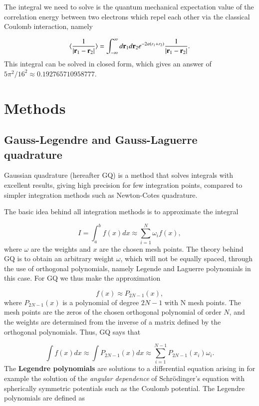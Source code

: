 \documentclass{article}
\begin{document}
\begin{multicols}{2}
The integral we need to solve is the quantum mechanical expectation value of the correlation energy between two electrons which repel each other via the classical Coulomb interaction, namely

\begin{equation}\label{eq:correlationenergy}
	\langle \frac{1}{|{\bf r}_1-{\bf r}_2|} \rangle = \int_{-\infty}^{\infty} d{\bf r}_1d{\bf r}_2  e^{-2\alpha (r_1+r_2)}\frac{1}{|{\bf r}_1-{\bf r}_2|}.
\end{equation}
This integral can be solved in closed form, which gives an answer of $5\pi^2/16^2 \approx 0.192765710958777$.



\section{Methods}

\subsection{Gauss-Legendre and Gauss-Laguerre quadrature}
Gaussian quadrature (hereafter GQ) is a method that solves integrals with excellent results, giving high precision for few integration points, compared to simpler integration methods such as Newton-Cotes quadrature. 

The basic idea behind all integration methods is to approximate the integral

\begin{equation}
	I = \int_a^b f(x) dx \approx \sum_{i = 1}^N \omega_i f(x),
\end{equation}
where $\omega$ are the weights and $x$ are the chosen mesh points. The theory behind GQ is to obtain an arbitrary weight $\omega$, which will not be equally spaced, through the use of orthogonal polynomials, namely Legende and Laguerre polynomials in this case. For GQ we thus make the approximation

\begin{equation}
	f(x) \approx P_{2N-1} (x),
\end{equation}
where $P_{2N-1} (x)$ is a polynomial of degree $2N-1$ with N mesh points. The mesh points are the zeros of the chosen orthogonal polynomial of order $N$, and the weights are determined from the inverse of a matrix defined by the orthogonal polynomials. Thus, GQ says that

\begin{equation}
	\int f(x) dx \approx \int P_{2N-1}(x) dx \approx \sum_{i = 1}^{N-1} P_{2N-1}(x_i) \omega_i.
\end{equation}
The \textbf{Legendre polynomials} are solutions to a differential equation arising in for example the solution of the \textit{angular dependence} of Schr\"{o}dinger's equation with spherically symmetric potentials such as the Coulomb potential. The Legendre polynomials are defined as


\end{multicols}
\end{document}
